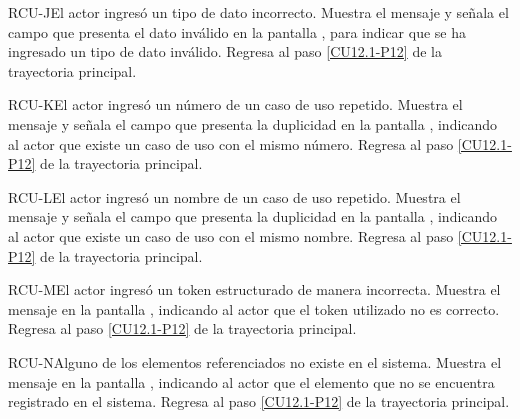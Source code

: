 	\begin{UCtrayectoriaA}{RCU-J}{El actor ingresó un tipo de dato incorrecto.}
		\UCpaso[\UCsist] Muestra el mensaje  y señala el campo que presenta el dato inválido en la pantalla , para indicar que se ha ingresado un tipo de dato inválido.
		\UCpaso Regresa al paso \ref{CU12.1-P12} de la trayectoria principal.
	\end{UCtrayectoriaA}

	\begin{UCtrayectoriaA}{RCU-K}{El actor ingresó un número de un caso de uso repetido.}
		\UCpaso[\UCsist] Muestra el mensaje  y señala el campo que presenta la duplicidad en la pantalla , indicando al actor que existe un caso de uso con el mismo número.
		\UCpaso Regresa al paso \ref{CU12.1-P12} de la trayectoria principal.
	\end{UCtrayectoriaA}
	
	\begin{UCtrayectoriaA}{RCU-L}{El actor ingresó un nombre de un caso de uso repetido.}
		\UCpaso[\UCsist] Muestra el mensaje  y señala el campo que presenta la duplicidad en la pantalla , indicando al actor que existe un caso de uso con el mismo nombre.
		\UCpaso Regresa al paso \ref{CU12.1-P12} de la trayectoria principal.
	\end{UCtrayectoriaA}

	\begin{UCtrayectoriaA}{RCU-M}{El actor ingresó un token estructurado de manera incorrecta.}
		\UCpaso[\UCsist] Muestra el mensaje  en la pantalla , indicando al actor que el token utilizado no es correcto.
		\UCpaso Regresa al paso \ref{CU12.1-P12} de la trayectoria principal.
	\end{UCtrayectoriaA}

	\begin{UCtrayectoriaA}{RCU-N}{Alguno de los elementos referenciados no existe en el sistema.}
		\UCpaso[\UCsist] Muestra el mensaje  en la pantalla , indicando al actor que el elemento que no se encuentra registrado en el sistema.
		\UCpaso Regresa al paso \ref{CU12.1-P12} de la trayectoria principal.
	\end{UCtrayectoriaA}

